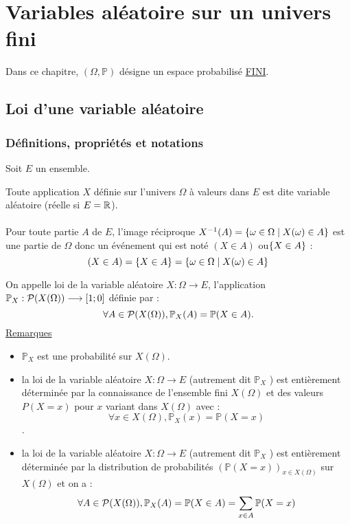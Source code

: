\chapter{Variables aléatoire sur un univers fini}
\minitoc 
    Dans ce chapitre, \((\Omega, \mathbb{P})\) désigne un espace probabilisé \underline{FINI}.
\section{Loi d’une variable aléatoire}
\subsection{Définitions, propriétés et notations}
    Soit \(E\) un ensemble.
\begin{defprop}
    Toute application \(X\) définie sur l’univers \(\Omega\) à valeurs dans \(E\) est dite variable aléatoire (réelle si \(E = \R\)).\\~\\
    Pour toute partie \(A\) de \(E\), l’image réciproque \(X^{-1} (A) = \accol{\omega \in  \Omega \tq X(\omega) \in  A}\) est une partie de \(\Omega\) donc un événement qui est noté \((X \in  A)\) ou\( \accol{X \in  A}\) :
   \[ (X \in  A) = \accol{X \in  A} = \accol{\omega \in  \Omega \tq X(\omega) \in  A}\] 
\end{defprop}
\begin{defprop}
    On appelle loi de la variable aléatoire \(X : \Omega \to E\), l’application \(\mathbb{P}_{X} : \cal{P} (X(\Omega)) \to \intervii{1}{0}\)  définie par :
    \[\forall A \in  \cal{P} (X (\Omega)) , \mathbb{P}_{X} (A) = \mathbb{P} (X \in  A) .\]
    \underline{Remarques}\\
    \begin{itemize}
        \item \(\mathbb{P}_{X}\) est une probabilité sur \(X(\Omega)\).
        \item la loi de la variable aléatoire \(X : \Omega \to E\) (autrement dit \(\mathbb{P}_{X}\) ) est entièrement déterminée par la connaissance de l’ensemble fini \(X (\Omega)\) et des valeurs \(P (X = x)\) pour \(x\) variant dans \(X (\Omega)\) avec :
            \[\forall x \in  X (\Omega) , \mathbb{P}_{X} ({x}) = \mathbb{P} (X = x)\] .
        \item la loi de la variable aléatoire \(X : \Omega \to E\) (autrement dit \(\mathbb{P}_{X}\) ) est entièrement déterminée par la distribution de probabilités \((\mathbb{P}(X = x))_{x\in X(\Omega)}\) sur \(X(\Omega)\) et on a :
            \[\forall A \in  \cal{P} (X (\Omega)) , \mathbb{P}_{X} (A) = \mathbb{P} (X \in  A) = \sum_{x\in A}\mathbb{P}(X = x)\]
    \end{itemize}
\end{defprop}
